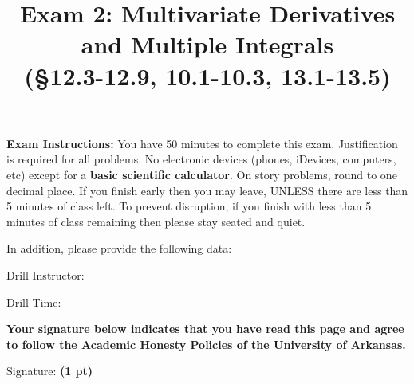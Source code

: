 \documentclass[12pt, addpoints]{exam/exam}
\title{\vspace{-8pc}
\vfill{\Huge
	\bf Exam 2: Multivariate Derivatives \\ and Multiple Integrals \\ (\S 12.3-12.9, 10.1-10.3, 13.1-13.5)} 
	}
\date{}
\theoremstyle{plain}
\begin{document}
\begin{coverpages}
\maketitle
\thispagestyle{headandfoot}
\vspace{-4pc}
{\bf Exam Instructions:} You have 50 minutes to complete this exam.  Justification is required for all problems.  %
No electronic devices (phones, iDevices, computers, etc) except for a \textbf{basic scientific calculator}.  On story problems, round to one decimal place. If you finish early then you may leave, UNLESS there are less than 5 minutes of class left.  To prevent disruption, if you finish with less than 5 minutes of class remaining then please stay seated and quiet.

\begin{flushright}
In addition, please provide the following data:

\vspace{0.3in}
Drill Instructor: \underline{\hspace{40ex}}

\vspace{0.3in}
Drill Time: \underline{\hspace{40ex}}
\end{flushright}

\vfill
\textbf{Your signature below indicates that you have read this page and agree to follow the Academic Honesty Policies of the University of Arkansas.}  

\vspace{0.3in}
Signature: {\bf (1 pt)} \underline{\hspace{73ex}}

\newpage

\begin{center}
\vspace*{\fill}
\vspace*{\fill}
\end{center}
\end{coverpages}
\end{document}
